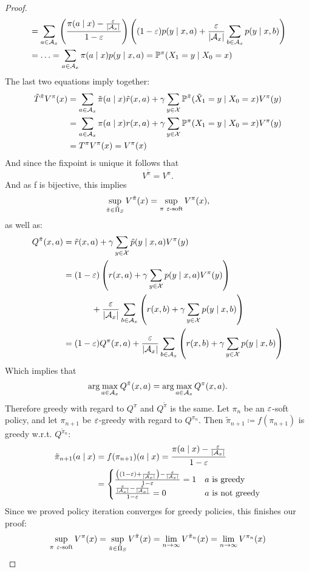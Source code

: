\begin{proof}
\begin{align*}
		&=\sum_{a\in\mathcal{A}_x}\left(\frac{\pi(a\mid x)-\frac{\varepsilon}{|\mathcal{A}_x|}}{1-\varepsilon} \right)
		\left((1-\varepsilon)p(y\mid x,a)+\frac{\varepsilon}{|\mathcal{A}_x|}\sum_{b\in\mathcal{A}_x}p(y\mid x,b)\right)\\
		&=\dotsc = \sum_{a\in\mathcal{A}_x} \pi(a\mid x)p(y\mid x,a) =\mathbb{P}^\pi(X_1=y\mid X_0=x)
	\end{align*}
	The last two equations imply together:
	\begin{align*}
		\tilde{T}^{\tilde{\pi}}V^\pi(x)&=\sum_{a\in\mathcal{A}_x}\tilde{\pi}(a\mid x)\tilde{r}(x,a) 
		+ \gamma \sum_{y\in\mathcal{X}}\mathbb{P}^{\tilde{\pi}}(\tilde{X}_1=y\mid X_0=x)V^\pi(y)\\
		&=\sum_{a\in\mathcal{A}_x}\pi(a\mid x)r(x,a) + \gamma \sum_{y\in\mathcal{X}}\mathbb{P}^\pi(X_1=y\mid X_0=x)V^\pi(y)\\
		&=T^\pi V^\pi(x)=V^\pi(x)
	\end{align*}
	And since the fixpoint is unique it follows that
	\[
		V^{\tilde{\pi}}=V^\pi.
	\]
	And as f is bijective, this implies
	\[
		\sup_{\tilde{\pi}\in \tilde{\Pi}_S}V^{\tilde{\pi}}(x)=\sup_{\pi\ \varepsilon\text{-soft}} V^\pi(x),
	\]
	as well as:
	\begin{align*}
		Q^{\tilde{\pi}}(x,a)&=\tilde{r}(x,a)+\gamma \sum_{y\in\mathcal{X}} \tilde{p}(y\mid x,a) V^\pi(y)\\
		&=\begin{aligned}[t]
			&(1-\varepsilon)\left(r(x,a)+\gamma \sum_{y\in\mathcal{X}}p(y\mid x,a) V^\pi(y) \right)\\
			&\qquad + \frac{\varepsilon}{|\mathcal{A}_x|}\sum_{b\in\mathcal{A}_x}\left(r(x,b)+\gamma \sum_{y\in\mathcal{X}}p(y\mid x,b) \right)
		\end{aligned}\\
		&=(1-\varepsilon)Q^\pi(x,a)
		+ \frac{\varepsilon}{|\mathcal{A}_x|}\sum_{b\in\mathcal{A}_x}\left(r(x,b)+\gamma \sum_{y\in\mathcal{X}}p(y\mid x,b) \right)
	\end{align*}
	Which implies that
	\[
		\arg\max_{a\in\mathcal{A}_x} Q^{\tilde{\pi}}(x,a)=\arg\max_{a\in\mathcal{A}_x} Q^\pi(x,a).
	\]
	Therefore greedy with regard to \(Q^\pi\) and \(Q^{\tilde{\pi}}\) is the same. Let \(\pi_n\) be an \(\varepsilon\)-soft policy, and let \(\pi_{n+1}\) be \(\varepsilon\)-greedy with regard to 
	\(Q^{\pi_n}\). Then \(\tilde{\pi}_{n+1}\coloneqq f(\pi_{n+1})\) is greedy w.r.t. 
	\(Q^{\tilde{\pi}_n}\):
	\begin{align*}
		\tilde{\pi}_{n+1}(a\mid x)&=f(\pi_{n+1})(a\mid x)
		=\frac{\pi(a\mid x)-\frac{\varepsilon}{|\mathcal{A}_x|}}{1-\varepsilon}\\
		&=\begin{cases}
			\frac{\left((1-\varepsilon) + \frac{\varepsilon}{|\mathcal{A}_x|}\right) -\frac{\varepsilon}{|\mathcal{A}_x|}}{1-\varepsilon}=1 & a \text{ is greedy}\\
			\frac{\frac{\varepsilon}{|\mathcal{A}_x|}- \frac{\varepsilon}{|\mathcal{A}_x|}}{1-\varepsilon}=0 & a \text{ is not greedy}
		\end{cases}
	\end{align*}
	Since we proved policy iteration converges for greedy policies, this finishes our proof:
	\[
		\sup_{\pi\ \varepsilon\text{-soft}} V^\pi(x)
		=\sup_{\tilde{\pi}\in \tilde{\Pi}_S}V^{\tilde{\pi}}(x)
		=\lim_{n\to\infty} V^{\tilde{\pi}_n}(x)
		=\lim_{n\to\infty} V^{\pi_n}(x)
		\qedhere
	\]
\end{proof}


